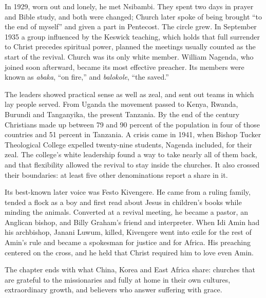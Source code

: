 In 1929, worn out and lonely, he met Nsibambi. They spent two days in prayer and Bible study, and
both were changed; Church later spoke of being brought ``to the end of myself'' and given a part in
Pentecost. The circle grew. In September 1935 a group influenced by the Keswick teaching, which
holds that full surrender to Christ precedes spiritual power, planned the meetings usually counted
as the start of the revival. Church was its only white member. William Nagenda, who joined soon
afterward, became its most effective preacher. Its members were known as \emph{abaka}, ``on fire,''
and \emph{balokole}, ``the saved.''

The leaders showed practical sense as well as zeal, and sent out teams in which lay people served.
From Uganda the movement passed to Kenya, Rwanda, Burundi and Tanganyika, the present Tanzania. By
the end of the century Christians made up between 79 and 90 percent of the population in four of
those countries and 51 percent in Tanzania. A crisis came in 1941, when Bishop Tucker Theological
College expelled twenty-nine students, Nagenda included, for their zeal. The college's white
leadership found a way to take nearly all of them back, and that flexibility allowed the revival to
stay inside the churches. It also crossed their boundaries: at least five other denominations report
a share in it.

Its best-known later voice was Festo Kivengere. He came from a ruling family, tended a flock as a boy
and first read about Jesus in children's books while minding the animals. Converted at a revival
meeting, he became a pastor, an Anglican bishop, and Billy Graham's friend and interpreter. When Idi
Amin had his archbishop, Janani Luwum, killed, Kivengere went into exile for the rest of Amin's
rule and became a spokesman for justice and for Africa. His preaching centered on the cross, and he
held that Christ required him to love even Amin.

The chapter ends with what China, Korea and East Africa share: churches that are grateful to the
missionaries and fully at home in their own cultures, extraordinary growth, and believers who answer
suffering with grace.

